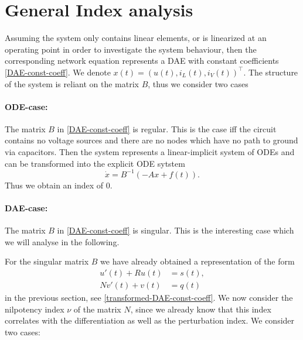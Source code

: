 \section{General Index analysis}

Assuming the system only contains linear elements, or is linearized at an operating point in order to investigate the system behaviour, then the corresponding network equation represents a DAE with constant coefficients \eqref{DAE-const-coeff}. We denote $x(t)=(u(t), i_L(t), i_V(t))^\top$. The structure of the system is reliant on the matrix $B$, thus we consider two cases

\paragraph{ODE-case:}
	The matrix $B$ in \eqref{DAE-const-coeff} is regular. This is the case iff the circuit contains no voltage sources and there are no nodes which have no path to ground via capacitors. Then the system represents a linear-implicit system of ODEs and can be transformed into the explicit ODE sytstem
	\begin{displaymath}
		\dot{x}=B^{-1}(-Ax+f(t)).
	\end{displaymath}
	Thus we obtain an index of $0$.
		
\paragraph{DAE-case:}
	The matrix $B$  in \eqref{DAE-const-coeff} is singular. This is the interesting case which we will analyse in the following.


For the singular matrix $B$ we have already obtained a representation of the form
\begin{align*}
	u'(t) + Ru(t) &= s(t), \\
	Nv'(t) + v(t) &= q(t)
\end{align*}
in the previous section, see \eqref{transformed-DAE-const-coeff}. We now consider the nilpotency index $\nu$ of the matrix $N$, since we already know that this index correlates with the differentiation as well as the perturbation index. We consider two cases:

